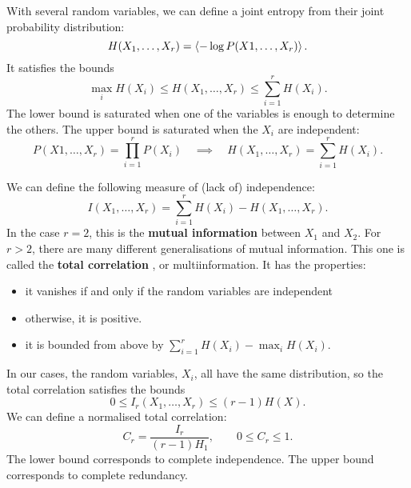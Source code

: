 \documentclass[12pt]{article}
\begin{document}
With several random variables, we can define a joint entropy from their joint probability distribution:
%
\begin{equation}\label{eq:jointent}
  H(X_1,\ldots,X_r) = \left\langle -\log P(X1,\ldots,X_r) \right\rangle.
\end{equation}
%
It satisfies the bounds
%
\begin{equation}\label{eq:entbounds}
  \max_i H(X_i) \leq H(X_1,\ldots,X_r) \leq \sum_{i=1}^r H(X_i).
\end{equation}
%
The lower bound is saturated when one of the variables is enough to determine the others. The upper bound is saturated when the $X_i$ are independent:
%
\begin{equation}\label{eq:indent}
  P(X1,\ldots,X_r) = \prod_{i=1}^r P(X_i)
  \quad \implies \quad
  H(X_1,\ldots,X_r) = \sum_{i=1}^r H(X_i).
\end{equation}
%

We can define the following measure of (lack of) independence:
%
\begin{equation}\label{eq:mutinf}
  I(X_1,\ldots,X_r) = \sum_{i=1}^r H(X_i) - H(X_1,\ldots,X_r).
\end{equation}
%
In the case $r=2$, this is the \textbf{mutual information} between $X_1$ and $X_2$. For $r>2$, there are many different generalisations of mutual information. This one is called the \textbf{total correlation} \cite{Watanabe:1960:ITA:1661258.1661265}, or multiinformation. It has the properties:
%
\begin{itemize}
  \item it vanishes if and only if the random variables are independent
  \item otherwise, it is positive.
  \item it is bounded from above by $\sum_{i=1}^r H(X_i) - \max_i H(X_i)$.
\end{itemize}
%

In our cases, the random variables, $X_i$, all have the same distribution, so the total correlation satisfies the bounds
%
\begin{equation}\label{eq:mutinfbounds}
  0 \leq I_r(X_1,\ldots,X_r) \leq (r-1)H(X).
\end{equation}
%
We can define a normalised total correlation:
%
\begin{equation}\label{eq:normmutinf}
  C_r = \frac{I_r}{(r-1)H_1}, \qquad 0 \leq C_r \leq 1.
\end{equation}
%
The lower bound corresponds to complete independence. The upper bound corresponds to complete redundancy.
\end{document}
